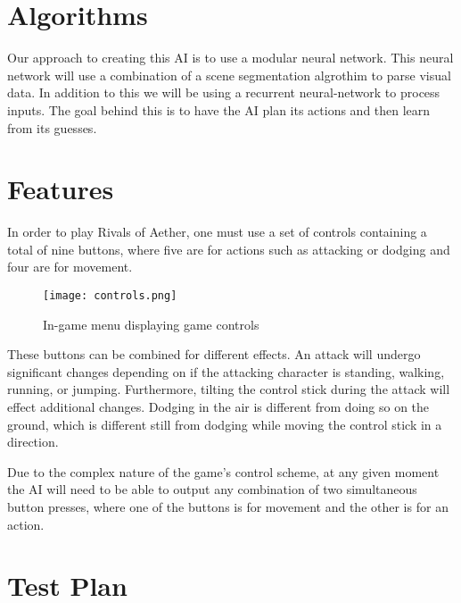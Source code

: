 


\section{Algorithms}


Our approach to creating this AI is to use a modular neural network. This neural network will use a combination of a scene segmentation algrothim to parse visual data. In addition to this we will be using a recurrent neural-network to process inputs. The goal behind this is to have the AI plan its actions and then learn from its guesses. 




\section{Features}

In order to play Rivals of Aether, one must use a set of controls containing a total of nine buttons, where five are for actions such as attacking or dodging and four are for movement.

\begin{figure}
	\caption{In-game menu displaying game controls}
	\centering
	\texttt{[image: controls.png]} \\
\end{figure}

These buttons can be combined for different effects. An attack will undergo significant changes depending on if the attacking character is standing, walking, running, or jumping. Furthermore, tilting the control stick during the attack will effect additional changes. Dodging in the air is different from doing so on the ground, which is different still from dodging while moving the control stick in a direction.

Due to the complex nature of the game's control scheme, at any given moment the AI will need to be able to output any combination of two simultaneous button presses, where one of the buttons is for movement and the other is for an action.




\section{Test Plan}


